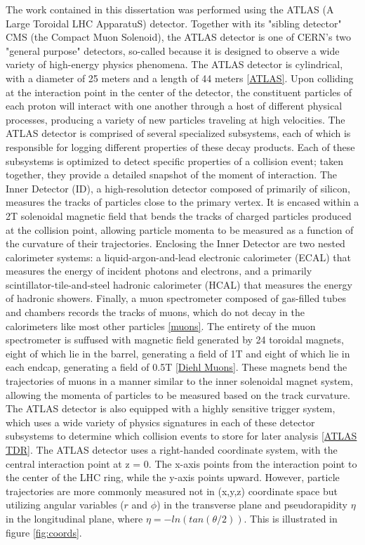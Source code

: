 The work contained in this dissertation was performed using the ATLAS (A Large Toroidal LHC ApparatuS) detector. Together with its "sibling detector" CMS (the Compact Muon Solenoid), the ATLAS detector is one of CERN's two "general purpose" detectors, so-called because it is designed to observe a wide variety of high-energy physics phenomena. The ATLAS detector is cylindrical, with a diameter of 25 meters and a length of 44 meters \ref{ATLAS}. Upon colliding at the interaction point in the center of the detector, the constituent particles of each proton will interact with one another through a host of different physical processes, producing a variety of new particles traveling at high velocities. The ATLAS detector is comprised of several specialized subsystems, each of which is responsible for logging different properties of these decay products. Each of these subsystems is optimized to detect specific properties of a collision event; taken together, they provide a detailed snapshot of the moment of interaction.
	The Inner Detector (ID), a high-resolution detector composed of primarily of silicon, measures the tracks of particles close to the primary vertex. It is encased within a 2T solenoidal magnetic field that bends the tracks of charged particles produced at the collision point, allowing particle momenta to be measured as a function of the curvature of their trajectories. Enclosing the Inner Detector are two nested calorimeter systems: a liquid-argon-and-lead electronic calorimeter (ECAL) that measures the energy of incident photons and electrons, and a primarily scintillator-tile-and-steel hadronic calorimeter (HCAL) that measures the energy of hadronic showers. Finally, a muon spectrometer composed of gas-filled tubes and chambers records the tracks of muons, which do not decay in the calorimeters like most other particles \ref{muons}.
	The entirety of the muon spectrometer is suffused with magnetic field generated by 24 toroidal magnets, eight of which lie in the barrel, generating a field of 1T and eight of which lie in each endcap, generating a field of 0.5T \ref{Diehl Muons}. These magnets bend the trajectories of muons in a manner similar to the inner solenoidal magnet system, allowing the momenta of particles to be measured based on the track curvature. The ATLAS detector is also equipped with a highly sensitive trigger system, which uses a wide variety of physics signatures in each of these detector subsystems to determine which collision events to store for later analysis \ref{ATLAS TDR}.
	The ATLAS detector uses a right-handed coordinate system, with the central interaction point at z = 0. The x-axis points from the interaction point to the center of the LHC ring, while the y-axis points upward. However, particle trajectories are more commonly measured not in (x,y,z) coordinate space but utilizing angular variables (\(r\) and \( \phi \)) in the transverse plane and pseudorapidity \( \eta \) in the longitudinal plane, where \( \eta = -ln(tan( \theta /2) ) \). This is illustrated in figure \ref{fig:coords}.

